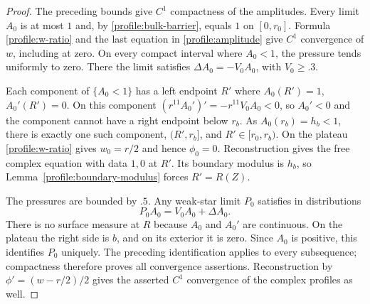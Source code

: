 \documentclass[11pt]{article}
\numberwithin{equation}{section}
\theoremstyle{definition}
\theoremstyle{remark}
\begin{document}
\begin{proof}
The preceding bounds give $C^1$ compactness of the amplitudes.  Every
limit $A_0$ is at most $1$ and, by \eqref{profile:bulk-barrier}, equals
$1$ on $[0,r_0]$.  Formula \eqref{profile:w-ratio} and the last equation
in \eqref{profile:amplitude} give $C^1$ convergence of $w$, including at
zero.  On every compact interval where $A_0<1$, the pressure tends
uniformly to zero.  There the limit satisfies $\Delta A_0=-V_0A_0$,
with $V_0\ge.3$.

Each component of $\{A_0<1\}$ has a left endpoint $R'$ where
$A_0(R')=1$, $A_0'(R')=0$.  On this component
$(r^{11}A_0')'=-r^{11}V_0A_0<0$, so $A_0'<0$ and the component cannot
have a right endpoint below $r_b$.  As $A_0(r_b)=h_b<1$, there is exactly
one such component, $(R',r_b]$, and $R'\in[r_0,r_b)$.  On the plateau
\eqref{profile:w-ratio} gives $w_0=r/2$ and hence $\phi_0=0$.
Reconstruction gives the free complex equation with data $1,0$ at $R'$.
Its boundary modulus is $h_b$, so
Lemma~\ref{profile:boundary-modulus} forces $R'=R(Z)$.

The pressures are bounded by $.5$.  Any weak-star limit $P_0$ satisfies
in distributions
\[
 P_0A_0=V_0A_0+\Delta A_0.
\]
There is no surface measure at $R$ because $A_0$ and $A_0'$ are
continuous.  On the plateau the right side is $b$, and on its exterior
it is zero.  Since $A_0$ is positive, this identifies $P_0$ uniquely.
The preceding identification applies to every subsequence; compactness
therefore proves all convergence assertions.  Reconstruction by
$\phi'=(w-r/2)/2$ gives the asserted $C^1$ convergence of the complex
profiles as well.
\end{proof}
\end{document}
